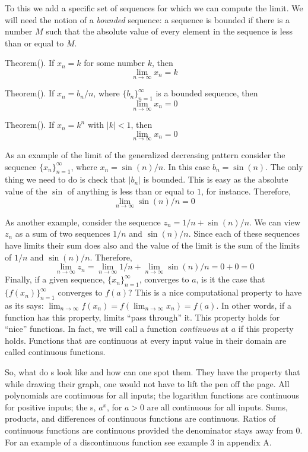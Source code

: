 To this we add a specific set of sequences for which we can
compute the limit. We will need the notion of a {\it bounded\/} sequence:
a sequence is bounded if there is a number $M$ such that
the absolute value of every element in the sequence is less than
or equal to $M$.


\proclaim Theorem(). If $x_n = k$ for some number $k$, then 
$$
\lim_{n \rightarrow \infty} x_n = k
$$

\proclaim Theorem(). If $x_n = b_n / n$, where $\{b_n\}_{n=1}^{\infty}$ is a bounded sequence, then
$$
\lim_{n \rightarrow \infty} x_n = 0
$$

\proclaim Theorem(). If $x_n = k^n$ with $|k| < 1$, then
$$
\lim_{n \rightarrow \infty} x_n = 0
$$


As an example of the limit of the generalized decreasing  pattern consider
the sequence 
$\{x_n\}_{n=1}^{\infty}$,
where $x_n = \sin(n) / n$. In this case $b_n = \sin(n)$. The only thing we 
need to do is check that $|b_n|$ is bounded. This is easy as the 
absolute value of the $\sin$ of anything is less than or equal to  $1$, 
for instance. Therefore,
$$
\lim_{n \rightarrow \infty} \sin(n)/ n = 0
$$

As another example, consider the sequence $z_n = 1/n + \sin(n)/n$.
We can view $z_n$ as a sum of two sequences $1/n$ and 
$\sin(n)/n$. Since each of these sequences have limits 
their sum does also and the value of the limit is the sum of 
the limits of $1/n$ and $\sin(n)/n$. Therefore, 
$$
\lim_{n \rightarrow \infty} z_n = \lim_{n \rightarrow \infty} 1/n + 
\lim_{n \rightarrow \infty} \sin(n)/n = 0 + 0 = 0
$$
Finally, if a given sequence, $\{x_n\}_{n=1}^\infty$, converges to $a$, is it
the case that $\{f(x_n)\}_{n=1}^\infty$ converges to $f(a)$? This is a nice computational property to
have as its says: $\lim_{n\rightarrow \infty} f(x_n) = f(\lim_{n \rightarrow \infty} x_n) = f(a)$. In other words, 
if a function has this property, limits ``pass through'' it.
This property holds for 
``nice'' functions. In fact, we will call a function {\it continuous\/} at $a$ 
if this property holds. Functions that are continuous at every input value in their domain are called continuous functions.

So, what do s look like and how 
can one spot them. 
They have the property that while drawing their graph, one would not have to 
lift the pen off the page.
All polynomials are continuous for all inputs; the logarithm functions 
are continuous for positive inputs; the s, $a^x$, for $a>0$ 
are all continuous for all inputs. Sums, products, and differences of continuous 
functions are continuous. Ratios of continuous functions are continuous provided the denominator 
stays away from 0. For an example of a discontinuous function see
example 3 in appendix A.

